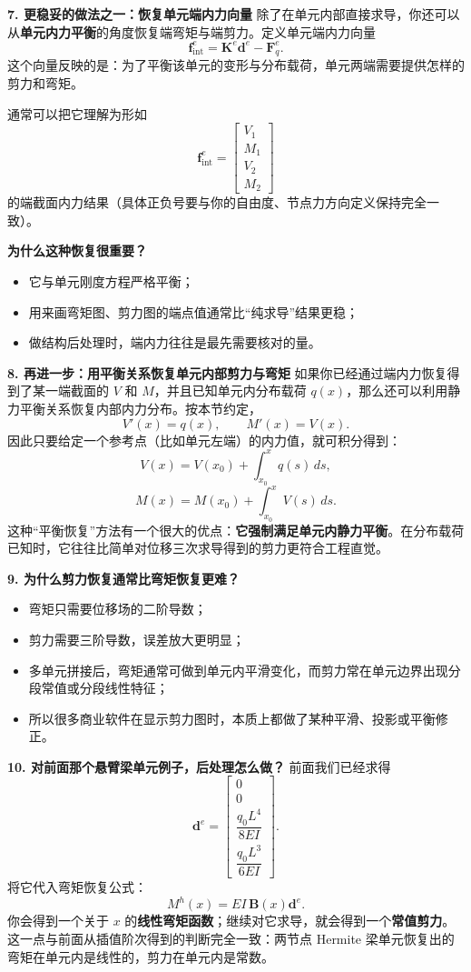 \documentclass[11pt, a4paper, UTF8]{ctexart}
\begin{document}
\textbf{7. 更稳妥的做法之一：恢复单元端内力向量}
除了在单元内部直接求导，你还可以从\textbf{单元内力平衡}的角度恢复端弯矩与端剪力。定义单元端内力向量
\[
\bm{f}_{\text{int}}^e = \bm{K}^e \bm{d}^e - \bm{F}_q^e.
\]
这个向量反映的是：为了平衡该单元的变形与分布载荷，单元两端需要提供怎样的剪力和弯矩。

通常可以把它理解为形如
\[
\bm{f}_{\text{int}}^e =
\begin{bmatrix}
V_1 \\ M_1 \\ V_2 \\ M_2
\end{bmatrix}
\]
的端截面内力结果（具体正负号要与你的自由度、节点力方向定义保持完全一致）。

\textbf{为什么这种恢复很重要？}
\begin{itemize}
    \item 它与单元刚度方程严格平衡；
    \item 用来画弯矩图、剪力图的端点值通常比“纯求导”结果更稳；
    \item 做结构后处理时，端内力往往是最先需要核对的量。
\end{itemize}

\textbf{8. 再进一步：用平衡关系恢复单元内部剪力与弯矩}
如果你已经通过端内力恢复得到了某一端截面的 $V$ 和 $M$，并且已知单元内分布载荷 $q(x)$，那么还可以利用静力平衡关系恢复内部内力分布。按本节约定，
\[
V'(x)=q(x), \qquad M'(x)=V(x).
\]
因此只要给定一个参考点（比如单元左端）的内力值，就可积分得到：
\[
V(x)=V(x_0)+\int_{x_0}^{x} q(s)\, ds,
\]
\[
M(x)=M(x_0)+\int_{x_0}^{x} V(s)\, ds.
\]
这种“平衡恢复”方法有一个很大的优点：\textbf{它强制满足单元内静力平衡}。在分布载荷已知时，它往往比简单对位移三次求导得到的剪力更符合工程直觉。

\textbf{9. 为什么剪力恢复通常比弯矩恢复更难？}
\begin{itemize}
    \item 弯矩只需要位移场的二阶导数；
    \item 剪力需要三阶导数，误差放大更明显；
    \item 多单元拼接后，弯矩通常可做到单元内平滑变化，而剪力常在单元边界出现分段常值或分段线性特征；
    \item 所以很多商业软件在显示剪力图时，本质上都做了某种平滑、投影或平衡修正。
\end{itemize}

\textbf{10. 对前面那个悬臂梁单元例子，后处理怎么做？}
前面我们已经求得
\[
\bm{d}^e =
\begin{bmatrix}
0 \\ 0 \\ \dfrac{q_0L^4}{8EI} \\ \dfrac{q_0L^3}{6EI}
\end{bmatrix}.
\]
将它代入弯矩恢复公式：
\[
M^h(x)=EI\,\bm{B}(x)\bm{d}^e.
\]
你会得到一个关于 $x$ 的\textbf{线性弯矩函数}；继续对它求导，就会得到一个\textbf{常值剪力}。这一点与前面从插值阶次得到的判断完全一致：两节点 Hermite 梁单元恢复出的弯矩在单元内是线性的，剪力在单元内是常数。
\end{document}
